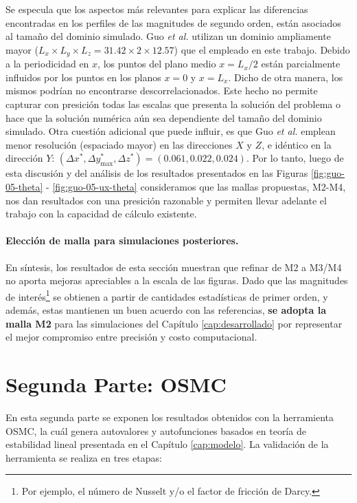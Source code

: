 Se especula que los aspectos más relevantes para explicar las diferencias encontradas en los perfiles de las magnitudes de segundo orden, están asociados al tamaño del dominio simulado. Guo \textit{et al.} utilizan un dominio ampliamente mayor ($L_x \times L_y \times L_z = 31\text{.}42 \times 2 \times 12\text{.}57$) que el empleado en este trabajo. Debido a la periodicidad en $x$, los puntos del plano medio $x = L_x/2$ están parcialmente influidos por los puntos en los planos $x=0$ y $x=L_x$. Dicho de otra manera, los mismos podrían no encontrarse descorrelacionados. Este hecho no permite capturar con presición todas las escalas que presenta la solución del problema o hace que la solución numérica aún sea dependiente del tamaño del dominio simulado. Otra cuestión adicional que puede influir, es que Guo \textit{et al.} emplean menor resolución (espaciado mayor) en las direcciones $X$ y $Z$, e idéntico en la dirección $Y$: $(\Delta x^*,\Delta y^*_{\text{max}},\Delta z^*) = (0\text{.}061, 0\text{.}022, 0\text{.}024)$. Por lo tanto, luego de esta discusión y del análisis de los resultados presentados en las Figuras \ref{fig:guo-05-theta} - \ref{fig:guo-05-ux-theta} consideramos que las mallas propuestas, M2-M4, nos dan resultados con una presición razonable y permiten llevar adelante el trabajo con la capacidad de cálculo existente. 

\paragraph{Elección de malla para simulaciones posteriores.}

En síntesis, los resultados de esta sección muestran que refinar de M2 a M3/M4 no aporta mejoras apreciables a la escala de las figuras. Dado que las magnitudes de interés\footnote{Por ejemplo, el número de Nusselt y/o el factor de fricción de Darcy.} se obtienen a partir de cantidades estadísticas de primer orden, y además, estas mantienen un buen acuerdo con las referencias, \textbf{se adopta la malla M2} para las simulaciones del Capítulo \ref{cap:desarrollado} por representar el mejor compromiso entre precisión y costo computacional.


\section{Segunda Parte: OSMC}

En esta segunda parte se exponen los resultados obtenidos con la herramienta OSMC, la cuál genera autovalores y autofunciones basados en teoría de estabilidad lineal presentada en el Capítulo \ref{cap:modelo}. La validación de la herramienta se realiza en tres etapas: 

